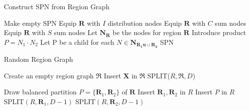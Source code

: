 \begin{algorithm}[H]
\caption{Construct SPN from Region Graph}
\label{alg:rg-to-spn}
\small
\begin{algorithmic}[1]
\State Make empty SPN
		\State Equip $\mathbf{R}$ with $\mathit{I}$ distribution nodes
		\State Equip $\mathbf{R}$ with $\mathit{C}$ sum nodes
	\Else
		\State Equip $\mathbf{R}$ with $\mathit{S}$ sum nodes 
	\EndIf
\EndFor
{}
	\State Let $\mathbf{N_R}$ be the nodes for region $\mathbf{R}$
		\State Introduce product $P = N_1 \cdot N_2$
		\State Let P be a child for each $N \in \mathbf{N_{R_1 u \cup R_2}}$
	\EndFor
\EndFor
\State \Return SPN
\end{algorithmic}
\end{algorithm}

\begin{algorithm}[H]
\caption{Random Region Graph}
\label{alg:random-region-graph}
\small
\begin{algorithmic}[1]
\State Create an empty region graph $\mathfrak{R}$
\State Insert $\mathbf{X}$ in $\mathfrak{R}$
	\State SPLIT($\mathit{R},\mathfrak{R},\mathit{D}$)
\EndFor
\end{algorithmic}

\begin{algorithmic}[1]
	\State Draw balanced partition $\mathit{P} = \{ \mathbf{R}_1,\mathbf{R}_2 \}$ of $\mathbf{R}$
	\State Insert $\mathbf{R}_1,\mathbf{R}_2$ in $\mathit{R}$
	\State Insert $\mathit{P}$ in $\mathit{R}$
			\State SPLIT$(\mathit{R},\mathbf{R}_1,\mathit{D}-1)$
		\EndIf
			\State SPLIT$(\mathit{R},\mathbf{R}_2,\mathit{D}-1)$
		\EndIf
	\EndIf
\EndProcedure
\end{algorithmic}
\end{algorithm}

